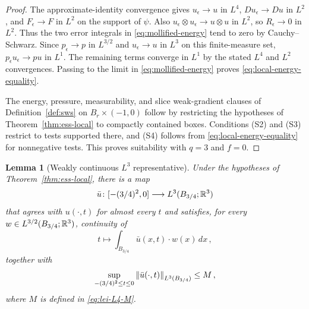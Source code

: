 \documentclass[11pt,letterpaper]{article}
\numberwithin{equation}{section}
\theoremstyle{plain}
\newtheorem{lemma}[theorem]{Lemma}
\theoremstyle{definition}
\theoremstyle{remark}
\begin{document}
\begin{proof}
The approximate-identity convergence gives $u_\epsilon\to u$ in $L^4$, $Du_\epsilon\to Du$ in $L^2$, and $F_\epsilon\to F$ in $L^2$ on the support of $\psi$. Also $u_\epsilon\otimes u_\epsilon\to u\otimes u$ in $L^2$, so $R_\epsilon\to0$ in $L^2$. Thus the two error integrals in \eqref{eq:mollified-energy} tend to zero by Cauchy--Schwarz. Since $p_\epsilon\to p$ in $L^{3/2}$ and $u_\epsilon\to u$ in $L^3$ on this finite-measure set, $p_\epsilon u_\epsilon\to pu$ in $L^1$. The remaining terms converge in $L^1$ by the stated $L^4$ and $L^2$ convergences. Passing to the limit in \eqref{eq:mollified-energy} proves \eqref{eq:local-energy-equality}.

The energy, pressure, measurability, and slice weak-gradient clauses of Definition~\ref{def:sws} on $B_r\times(-1,0)$ follow by restricting the hypotheses of Theorem~\ref{thm:ess-local} to compactly contained boxes. Conditions (S2) and (S3) restrict to tests supported there, and (S4) follows from \eqref{eq:local-energy-equality} for nonnegative tests. This proves suitability with $q=3$ and $f=0$.
\end{proof}

\begin{lemma}[Weakly continuous $L^3$ representative]\label{lem:weak-cont-L3}
Under the hypotheses of Theorem~\ref{thm:ess-local}, there is a map
\begin{equation}\label{eq:weak-cont-domain}
\bar u\colon[-(3/4)^2,0]\longrightarrow L^3(B_{3/4};\mathbb{R}^3)
\end{equation}
that agrees with $u(\cdot,t)$ for almost every $t$ and satisfies, for every $w\in L^{3/2}(B_{3/4};\mathbb{R}^3)$, continuity of
\begin{equation}\label{eq:weak-cont-pairing}
t\longmapsto\int_{B_{3/4}}\bar u(x,t)\cdot w(x)\,dx\,,
\end{equation}
together with
\begin{equation}\label{eq:weak-cont-bound}
\sup_{-(3/4)^2\le t\le0}\left\lVert \bar u(\cdot,t)\right\rVert_{L^3(B_{3/4})}\le M\,,
\end{equation}
where $M$ is defined in \eqref{eq:lei-L4-M}.
\end{lemma}
\end{document}
